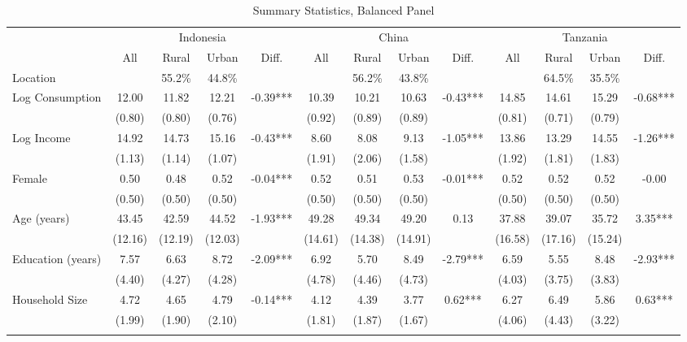 \begin{table}[htbp] \centering \caption{Summary Statistics, Balanced Panel}\label{tab:summary_stats_combined_bal}
\begin{threeparttable}
\begin{tabular}{l cccc cccc cccc} \toprule
& \multicolumn{4}{c}{Indonesia} & \multicolumn{4}{c}{China} & \multicolumn{4}{c}{Tanzania} \\
\cmidrule(lr){2-5} \cmidrule(lr){6-9} \cmidrule(lr){10-13}
& All & Rural & Urban & Diff. & All & Rural & Urban & Diff. & All & Rural & Urban & Diff. \\
Location &  &   55.2\% &   44.8\% &  &  &   56.2\% &   43.8\% &  &  &   64.5\% &   35.5\% &  \\  \addlinespace \addlinespace
Log Consumption & 12.00 & 11.82 & 12.21 & -0.39*** & 10.39 & 10.21 & 10.63 & -0.43*** & 14.85 & 14.61 & 15.29 & -0.68*** \\
 & (0.80) & (0.80) & (0.76) &  & (0.92) & (0.89) & (0.89) &  & (0.81) & (0.71) & (0.79) &  \\  \addlinespace
Log Income & 14.92 & 14.73 & 15.16 & -0.43*** & 8.60 & 8.08 & 9.13 & -1.05*** & 13.86 & 13.29 & 14.55 & -1.26*** \\
 & (1.13) & (1.14) & (1.07) &  & (1.91) & (2.06) & (1.58) &  & (1.92) & (1.81) & (1.83) &  \\  \addlinespace
Female & 0.50 & 0.48 & 0.52 & -0.04*** & 0.52 & 0.51 & 0.53 & -0.01*** & 0.52 & 0.52 & 0.52 & -0.00 \\
 & (0.50) & (0.50) & (0.50) &  & (0.50) & (0.50) & (0.50) &  & (0.50) & (0.50) & (0.50) &  \\  \addlinespace
Age (years) & 43.45 & 42.59 & 44.52 & -1.93*** & 49.28 & 49.34 & 49.20 & 0.13 & 37.88 & 39.07 & 35.72 & 3.35*** \\
 & (12.16) & (12.19) & (12.03) &  & (14.61) & (14.38) & (14.91) &  & (16.58) & (17.16) & (15.24) &  \\  \addlinespace
Education (years) & 7.57 & 6.63 & 8.72 & -2.09*** & 6.92 & 5.70 & 8.49 & -2.79*** & 6.59 & 5.55 & 8.48 & -2.93*** \\
 & (4.40) & (4.27) & (4.28) &  & (4.78) & (4.46) & (4.73) &  & (4.03) & (3.75) & (3.83) &  \\  \addlinespace
Household Size & 4.72 & 4.65 & 4.79 & -0.14*** & 4.12 & 4.39 & 3.77 & 0.62*** & 6.27 & 6.49 & 5.86 & 0.63*** \\
 & (1.99) & (1.90) & (2.10) &  & (1.81) & (1.87) & (1.67) &  & (4.06) & (4.43) & (3.22) &  \\  \addlinespace

\end{tabular}
\end{threeparttable}
\end{table}
